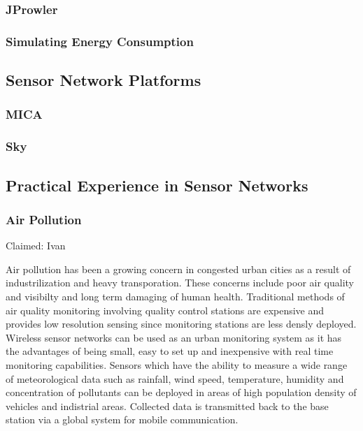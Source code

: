 \subsubsection{JProwler}

\subsubsection{Simulating Energy Consumption}
\cite{Shnayder04}


\subsection{Sensor Network Platforms}

\subsubsection{MICA}
\cite{Mica2002}

\subsubsection{Sky}


\subsection{Practical Experience in Sensor Networks}

\subsubsection{Air Pollution}
\cite{libeliumAirPollution}
\cite{wsnpollution} Claimed: Ivan

Air pollution has been a growing concern in congested urban cities as a result of industrilization and heavy transporation. These concerns include poor air quality and visibilty and long term damaging of human health. Traditional methods of air quality monitoring involving quality control stations are expensive and provides low resolution sensing since monitoring stations are less densly deployed. Wireless sensor networks can be used as an urban monitoring system as it has the advantages of being small, easy to set up and inexpensive with real time monitoring capabilities. Sensors which have the ability to measure a wide range of meteorological data such as rainfall, wind speed, temperature, humidity and concentration of pollutants can be deployed in areas of high population density of vehicles and indistrial areas. Collected data is transmitted back to the base station via a global system for mobile communication.

